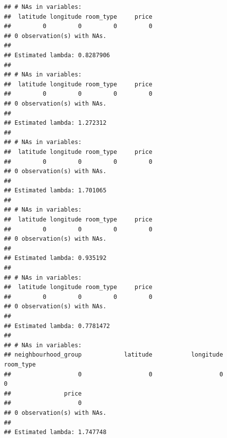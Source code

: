 \documentclass[
]{article}
\newenvironment{Shaded}{\begin{snugshade}}{\end{snugshade}}
\newcommand{\DecValTok}[1]{\textcolor[rgb]{0.00,0.00,0.81}{#1}}
\newcommand{\KeywordTok}[1]{\textcolor[rgb]{0.13,0.29,0.53}{\textbf{#1}}}
\newcommand{\NormalTok}[1]{#1}
\newcommand{\OperatorTok}[1]{\textcolor[rgb]{0.81,0.36,0.00}{\textbf{#1}}}
\newcommand{\StringTok}[1]{\textcolor[rgb]{0.31,0.60,0.02}{#1}}
\begin{document}
\begin{Shaded}
\end{Shaded}

\begin{verbatim}
## # NAs in variables:
##  latitude longitude room_type     price 
##         0         0         0         0 
## 0 observation(s) with NAs.
## 
## Estimated lambda: 0.8287906 
## 
## # NAs in variables:
##  latitude longitude room_type     price 
##         0         0         0         0 
## 0 observation(s) with NAs.
## 
## Estimated lambda: 1.272312 
## 
## # NAs in variables:
##  latitude longitude room_type     price 
##         0         0         0         0 
## 0 observation(s) with NAs.
## 
## Estimated lambda: 1.701065 
## 
## # NAs in variables:
##  latitude longitude room_type     price 
##         0         0         0         0 
## 0 observation(s) with NAs.
## 
## Estimated lambda: 0.935192 
## 
## # NAs in variables:
##  latitude longitude room_type     price 
##         0         0         0         0 
## 0 observation(s) with NAs.
## 
## Estimated lambda: 0.7781472 
## 
## # NAs in variables:
## neighbourhood_group            latitude           longitude           room_type 
##                   0                   0                   0                   0 
##               price 
##                   0 
## 0 observation(s) with NAs.
## 
## Estimated lambda: 1.747748
\end{verbatim}
\end{document}
